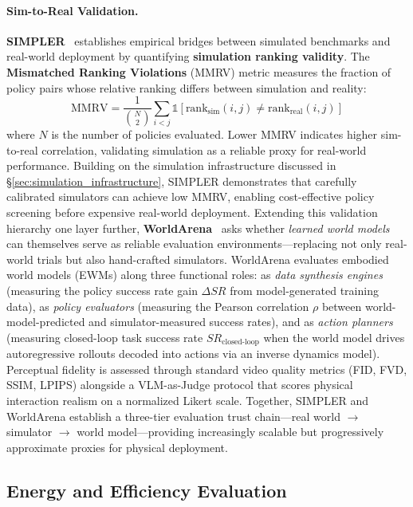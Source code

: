 \documentclass[acmsmall,screen,review,anonymous]{acmart}
\begin{document}
\paragraph{Sim-to-Real Validation.}
\textbf{SIMPLER}~\cite{li2025simpler} establishes empirical bridges between simulated benchmarks and real-world deployment by quantifying \textbf{simulation ranking validity}. The \textbf{Mismatched Ranking Violations} (MMRV) metric measures the fraction of policy pairs whose relative ranking differs between simulation and reality:
\begin{equation}
  \text{MMRV} = \frac{1}{\binom{N}{2}} \sum_{i < j} \mathbb{1}\left[\text{rank}_{\text{sim}}(i,j) \neq \text{rank}_{\text{real}}(i,j)\right]
\end{equation}
where $N$ is the number of policies evaluated. Lower MMRV indicates higher sim-to-real correlation, validating simulation as a reliable proxy for real-world performance. Building on the simulation infrastructure discussed in \S\ref{sec:simulation_infrastructure}, SIMPLER demonstrates that carefully calibrated simulators can achieve low MMRV, enabling cost-effective policy screening before expensive real-world deployment. Extending this validation hierarchy one layer further, \textbf{WorldArena}~\cite{shang2026worldarena} asks whether \emph{learned world models} can themselves serve as reliable evaluation environments---replacing not only real-world trials but also hand-crafted simulators. WorldArena evaluates embodied world models (EWMs) along three functional roles: as \emph{data synthesis engines} (measuring the policy success rate gain $\Delta SR$ from model-generated training data), as \emph{policy evaluators} (measuring the Pearson correlation $\rho$ between world-model-predicted and simulator-measured success rates), and as \emph{action planners} (measuring closed-loop task success rate $SR_{\text{closed-loop}}$ when the world model drives autoregressive rollouts decoded into actions via an inverse dynamics model). Perceptual fidelity is assessed through standard video quality metrics (FID, FVD, SSIM, LPIPS) alongside a VLM-as-Judge protocol that scores physical interaction realism on a normalized Likert scale. Together, SIMPLER and WorldArena establish a three-tier evaluation trust chain---real world $\to$ simulator $\to$ world model---providing increasingly scalable but progressively approximate proxies for physical deployment.

\subsection{Energy and Efficiency Evaluation}\label{sec:eval_energy}
\end{document}
